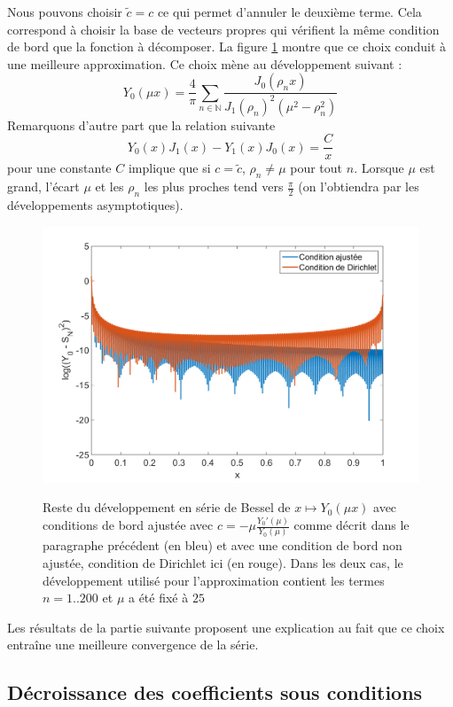 \documentclass[11pt,a4paper]{article}
\begin{document}
Nous pouvons choisir $\tilde{c} = c$ ce qui permet d'annuler le deuxième terme. Cela correspond à choisir la base de vecteurs propres qui vérifient la même condition de bord que la fonction à décomposer. La figure \ref{MeilleureDecompo} montre que ce choix conduit à une meilleure approximation. Ce choix mène au développement suivant : \[Y_0(\mu x) = \frac{4}{\pi}\sum_{n\in \mathbb{N}}\dfrac{J_0(\rho_n x)}{J_1(\rho_n)^2(\mu^2 - \rho_n^2)}\] Remarquons d'autre part que la relation suivante \[Y_0(x)J_1(x) - Y_1(x)J_0(x) = \frac{C}{x}\] pour une constante $C$ implique que si $c = \tilde{c}$, $\rho_n \neq \mu$ pour tout $n$. Lorsque $\mu$ est grand, l'écart $\mu$ et les $\rho_n$ les plus proches tend vers $\frac{\pi}{2}$ (on l'obtiendra par les développements asymptotiques).
\begin{figure}
\includegraphics[width=\textwidth]{MeilleureApprox.png} 
\label{MeilleureDecompo}
\caption{Reste du développement en série de Bessel de $x \mapsto Y_0(\mu x)
$ avec conditions de bord ajustée avec $c = -\mu\frac{Y_0'(\mu)}{Y_0(\mu)}$ comme décrit dans le paragraphe précédent (en bleu) et avec une condition de bord non ajustée, condition de Dirichlet ici (en rouge). Dans les deux cas, le développement utilisé pour l'approximation contient les termes $n = 1..200$ et $\mu$ a été fixé à $25$ }
\end{figure}


Les résultats de la partie suivante proposent une explication au fait que ce choix entraîne une meilleure convergence de la série. 

\subsection{Décroissance des coefficients sous conditions}
\end{document}
